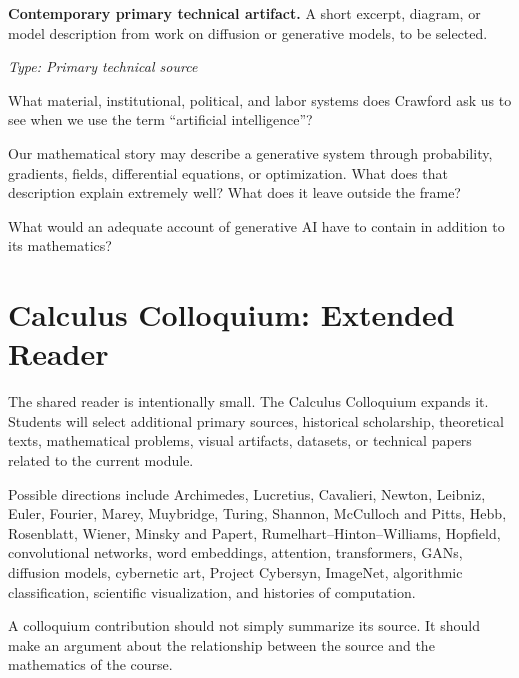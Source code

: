 \medskip

\textbf{Contemporary primary technical artifact.}
A short excerpt, diagram, or model description from work on diffusion or
generative models, to be selected.

\textit{Type: Primary technical source}

\begin{description}[leftmargin=1.15in,style=nextline]
\item[\textcolor{LangRed}{READ}]
What material, institutional, political, and labor systems does Crawford ask us
to see when we use the term ``artificial intelligence''?
\item[\textcolor{LangRed}{CONNECT}]
Our mathematical story may describe a generative system through probability,
gradients, fields, differential equations, or optimization. What does that
description explain extremely well? What does it leave outside the frame?
\item[\textcolor{LangRed}{QUESTION}]
What would an adequate account of generative AI have to contain in addition to
its mathematics?
\end{description}

\section{Calculus Colloquium: Extended Reader}

The shared reader is intentionally small. The Calculus Colloquium expands it.
Students will select additional primary sources, historical scholarship,
theoretical texts, mathematical problems, visual artifacts, datasets, or
technical papers related to the current module.

Possible directions include Archimedes, Lucretius, Cavalieri, Newton, Leibniz,
Euler, Fourier, Marey, Muybridge, Turing, Shannon, McCulloch and Pitts, Hebb,
Rosenblatt, Wiener, Minsky and Papert, Rumelhart--Hinton--Williams, Hopfield,
convolutional networks, word embeddings, attention, transformers, GANs,
diffusion models, cybernetic art, Project Cybersyn, ImageNet, algorithmic
classification, scientific visualization, and histories of computation.

A colloquium contribution should not simply summarize its source. It should
make an argument about the relationship between the source and the mathematics
of the course.
